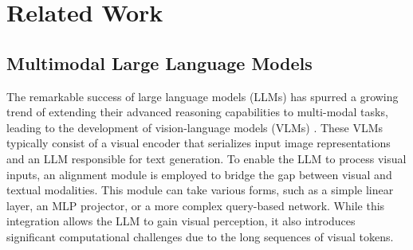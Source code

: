 \section{Related Work}
\subsection{Multimodal Large Language Models}

The remarkable success of large language models (LLMs) \citep{radford2019language, brown2020language} has spurred a growing trend of extending their advanced reasoning capabilities to multi-modal tasks, leading to the development of vision-language models (VLMs) \citep{huang2023languageneedaligningperception, driess2023palmeembodiedmultimodallanguage, liu2024visual, Qwen-VL}. These VLMs typically consist of a visual encoder \citep{radford2021learning} that serializes input image representations and an LLM responsible for text generation. To enable the LLM to process visual inputs, an alignment module is employed to bridge the gap between visual and textual modalities. This module can take various forms, such as a simple linear layer, an MLP projector, or a more complex query-based network. While this integration allows the LLM to gain visual perception, it also introduces significant computational challenges due to the long sequences of visual tokens.

